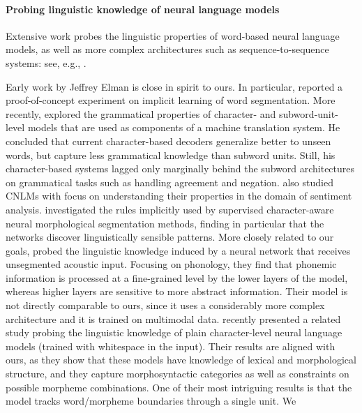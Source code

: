 \paragraph{Probing linguistic knowledge of neural language models}
Extensive work probes the linguistic properties of word-based neural
language models, as well as more complex architectures such as
sequence-to-sequence systems: see, e.g.,
.

Early work by Jeffrey Elman is close in spirit to ours. In particular,
 reported a proof-of-concept experiment on
implicit learning of word segmentation. More recently,
 explored the grammatical properties of
character- and subword-unit-level models that are used as components
of a machine translation system. He concluded that current
character-based decoders generalize better to unseen words, but
capture less grammatical knowledge than subword units. Still, his
character-based systems lagged only marginally behind the subword
architectures on grammatical tasks such as handling agreement and
negation.  also studied CNLMs
with focus on understanding their properties in the domain of
sentiment analysis.  investigated the rules
implicitly used by supervised character-aware neural morphological
segmentation methods, finding in particular that the networks discover
linguistically sensible patterns. More closely related to our goals,
 probed the linguistic knowledge induced
by a neural network that receives unsegmented acoustic input. Focusing
on phonology, they find that phonemic information is processed at a
fine-grained level by the lower layers of the model, whereas higher
layers are sensitive to more abstract information. Their model is not
directly comparable to ours, since it uses a considerably more complex
architecture and it is trained on multimodal
data.  recently presented a
related study probing the linguistic knowledge of plain
character-level neural language models (trained with whitespace in the
input). Their results are aligned with ours, as they show that these
models have knowledge of lexical and morphological structure, and they
capture morphosyntactic categories as well as constraints on possible
morpheme combinations. One of their most intriguing results is that
the model tracks word/morpheme boundaries through a single unit. We
